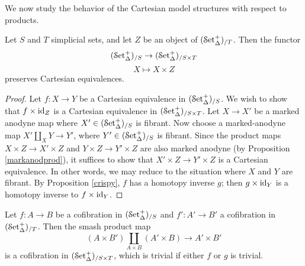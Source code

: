 
We now study the behavior of the Cartesian model structures with respect to products.

\begin{proposition}\label{urlt}
Let $S$ and $T$ simplicial sets, and let $Z$ be an object of $(\operatorname{\mathcal{S}et_{\Delta}^{+}})_{/T}$. Then the functor $$
(\operatorname{\mathcal{S}et_{\Delta}^{+}})_{/S} \rightarrow (\operatorname{\mathcal{S}et_{\Delta}^{+}})_{/S \times T}$$
$$ X \mapsto X \times Z$$
preserves Cartesian equivalences.
\end{proposition}

\begin{proof}
Let $f: X \rightarrow Y$ be a Cartesian equivalence in $(\operatorname{\mathcal{S}et_{\Delta}^{+}})_{/S}$. We wish to show that $f \times \operatorname{id}_{Z}$ is a Cartesian equivalence in $(\operatorname{\mathcal{S}et_{\Delta}^{+}})_{/S \times T}$. Let $X \rightarrow X'$ be a marked anodyne map where $X' \in (\operatorname{\mathcal{S}et_{\Delta}^{+}})_{/S}$ is fibrant. Now choose a marked-anodyne map $X' \coprod_{X} Y \rightarrow Y'$, where $Y' \in (\operatorname{\mathcal{S}et_{\Delta}^{+}})_{/S}$ is fibrant. Since the product maps $X \times Z \rightarrow X' \times Z$ and $Y \times Z \rightarrow Y' \times Z$ are also marked anodyne
(by Proposition \ref{markanodprod}), it suffices to show that $X' \times Z \rightarrow Y' \times Z$ is a Cartesian equivalence. In other words, we may reduce to the situation where $X$ and $Y$ are fibrant. By Proposition \ref{crispy}, $f$ has a homotopy inverse $g$; then
$g \times \operatorname{id}_Y$ is a homotopy inverse to $f \times \operatorname{id}_Y$.
\end{proof}

\begin{corollary}\label{compatprod}
Let $f: A \rightarrow B$ be a cofibration in $(\operatorname{\mathcal{S}et_{\Delta}^{+}})_{/S}$ and $f': A' \rightarrow B'$ a cofibration in $(\operatorname{\mathcal{S}et_{\Delta}^{+}})_{/T}$. Then the smash product map
$$(A \times B' ) \coprod_{ A \times B } (A' \times B) \rightarrow A' \times B'$$ is a cofibration in
$(\operatorname{\mathcal{S}et_{\Delta}^{+}})_{/S \times T}$, which is trivial if either $f$ or $g$ is trivial.
\end{corollary}


